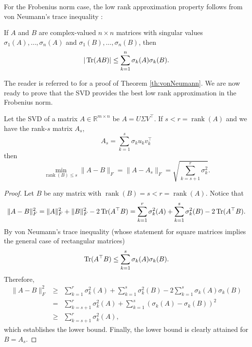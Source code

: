 For the Frobenius norm case, the low rank approximation property follows from von Neumann's trace inequality \cite{vonNeumann1937some}:
\begin{theorem}
\label{th:vonNeumann}
If $A$ and $B$ are complex-valued $n\times n$ matrices with singular values $\sigma_1(A),\ldots, \sigma_n(A)$ and $\sigma_1(B),\ldots, \sigma_n(B)$, then $$|\operatorname{Tr}(AB)| \leq \sum_{k=1}^n \sigma_k(A) \sigma_k(B).$$
\end{theorem}
The reader is referred to \cite{mirsky1975trace} for a proof of Theorem \ref{th:vonNeumann}. We are now ready to prove that the SVD provides the best low rank approximation in the Frobenius norm.
\begin{theorem}\label{th:rank_k_Frob}
Let the SVD of a matrix $A\in \mathbb{R}^{m\times n}$ be $A = U \Sigma V^\top  $. If $s < r = \operatorname{rank}(A)$ and we have the rank-$s$ matrix $A_s$,
$$A_s = \sum_{k=1}^s \sigma_k u_k v_k^\top  $$
then
$$\min_{\operatorname{rank}(B) \leq s} \|A - B \|_F = \|A - A_s \|_F =  \sqrt{\sum_{k=s+1}^r \sigma_k^2}.$$
\end{theorem}
\begin{proof}
Let $B$ be any matrix with $\operatorname{rank}(B) = s < r = \operatorname{rank}(A)$. Notice that
$$\|A - B\|_F^2 = \|A\|_F^2 + \|B\|_F^2 - 2\operatorname{Tr}(A^\top   B) = \sum_{k=1}^r \sigma_k^2(A) + \sum_{k=1}^s \sigma_k^2(B) - 2\operatorname{Tr}(A^\top   B).$$
By von Neumann's trace inequality (whose statement for square matrices implies the general case of rectangular matrices)
$$\operatorname{Tr}(A^\top   B) \leq \sum_{k=1}^s \sigma_k(A) \sigma_k(B).$$
Therefore,
\begin{eqnarray*}
\|A - B\|_F^2 &\geq&  \sum_{k=1}^r \sigma_k^2(A) + \sum_{k=1}^s \sigma_k^2(B) - 2\sum_{k=1}^s \sigma_k(A) \sigma_k(B) \\
&=& \sum_{k=s+1}^r \sigma_k^2(A) + \sum_{k=1}^s (\sigma_k(A) - \sigma_k(B))^2 \\
&\geq& \sum_{k=s+1}^r \sigma_k^2(A),
\end{eqnarray*}
which establishes the lower bound. Finally, the lower bound is clearly attained for $B = A_s$.
\end{proof}



